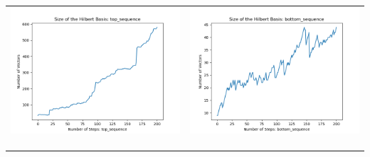 \documentclass[10pt]{article}
\begin{document}
\begin{tabular}{c|c}
\begin{minipage}{.4\textwidth}
\includegraphics[width=\textwidth]{"DATA/5d/6 generators 2 bound G/top_sequence SIZE"}
\end{minipage} &
\begin{minipage}{.4\textwidth}
\includegraphics[width=\textwidth]{"DATA/5d/6 generators 2 bound G bottomup/bottom_sequence SIZE"}
\end{minipage} \\ \\
\hline \\\begin{minipage}{.4\textwidth}

\end{minipage}
\end{tabular}
\end{document}
